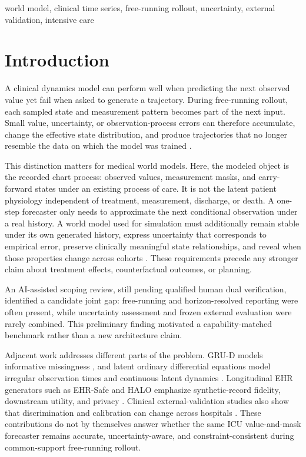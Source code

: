 \documentclass[conference]{IEEEtran}
\begin{document}
\begin{IEEEkeywords}
world model, clinical time series, free-running rollout, uncertainty, external validation, intensive care
\end{IEEEkeywords}

\section{Introduction}\label{introduction}

A clinical dynamics model can perform well when predicting the next observed
value yet fail when asked to generate a trajectory. During free-running
rollout, each sampled state and measurement pattern becomes part of the next
input. Small value, uncertainty, or observation-process errors can therefore
accumulate, change the effective state distribution, and produce trajectories
that no longer resemble the data on which the model was trained \cite{b5}.

This distinction matters for medical world models. Here, the modeled object is
the recorded chart process: observed values, measurement masks, and
carry-forward states under an existing process of care. It is not the latent
patient physiology independent of treatment, measurement, discharge, or
death. A one-step forecaster only
needs to approximate the next conditional observation under a real history. A
world model used for simulation must additionally remain stable under its own
generated history, express uncertainty that corresponds to empirical error,
preserve clinically meaningful state relationships, and reveal when those
properties change across cohorts \cite{b6,b7,b8}. These requirements precede any
stronger claim about treatment effects, counterfactual outcomes, or planning.

An AI-assisted scoping review, still pending qualified human dual verification,
identified a candidate joint gap: free-running and horizon-resolved reporting
were often present, while uncertainty assessment and frozen external
evaluation were rarely combined. This preliminary finding motivated a
capability-matched benchmark rather than a new architecture claim.

Adjacent work addresses different parts of the problem. GRU-D models
informative missingness \cite{b3}, and latent ordinary differential equations model
irregular observation times and continuous latent dynamics \cite{b9}. Longitudinal
EHR generators such as EHR-Safe and HALO emphasize synthetic-record fidelity,
downstream utility, and privacy \cite{b10,b11}. Clinical external-validation studies
also show that discrimination and calibration can change across hospitals
\cite{b12}. These contributions do not by themselves answer whether the same ICU
value-and-mask forecaster remains accurate, uncertainty-aware, and
constraint-consistent during common-support free-running rollout.
\end{document}
